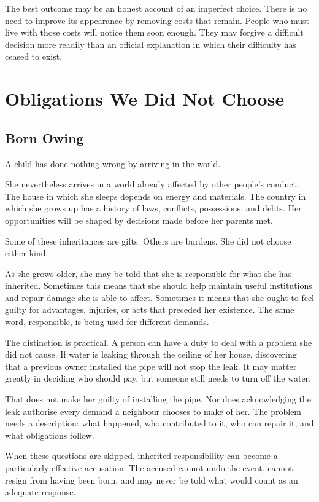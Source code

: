 \documentclass[12pt,a4paper]{book}
\begin{document}
The best outcome may be an honest account of an imperfect choice. There is no need to improve its appearance by removing costs that remain. People who must live with those costs will notice them soon enough. They may forgive a difficult decision more readily than an official explanation in which their difficulty has ceased to exist.

\part{Obligations We Did Not Choose}

\chapter{Born Owing}

A child has done nothing wrong by arriving in the world.

She nevertheless arrives in a world already affected by other people's conduct. The house in which she sleeps depends on energy and materials. The country in which she grows up has a history of laws, conflicts, possessions, and debts. Her opportunities will be shaped by decisions made before her parents met.

Some of these inheritances are gifts. Others are burdens. She did not choose either kind.

As she grows older, she may be told that she is responsible for what she has inherited. Sometimes this means that she should help maintain useful institutions and repair damage she is able to affect. Sometimes it means that she ought to feel guilty for advantages, injuries, or acts that preceded her existence. The same word, responsible, is being used for different demands.

The distinction is practical. A person can have a duty to deal with a problem she did not cause. If water is leaking through the ceiling of her house, discovering that a previous owner installed the pipe will not stop the leak. It may matter greatly in deciding who should pay, but someone still needs to turn off the water.

That does not make her guilty of installing the pipe. Nor does acknowledging the leak authorise every demand a neighbour chooses to make of her. The problem needs a description: what happened, who contributed to it, who can repair it, and what obligations follow.

When these questions are skipped, inherited responsibility can become a particularly effective accusation. The accused cannot undo the event, cannot resign from having been born, and may never be told what would count as an adequate response.
\end{document}
